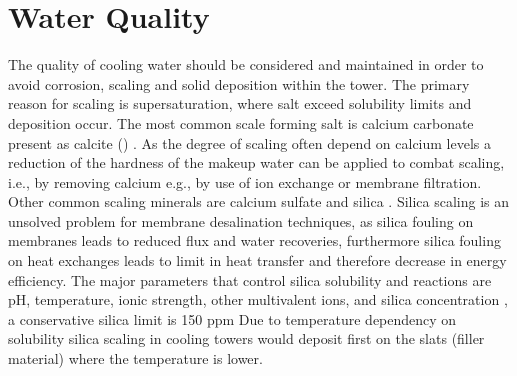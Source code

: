 \section{Water Quality}

The quality of cooling water should be considered and maintained in order to avoid corrosion, scaling and solid deposition within the tower.  \citep{IntroductionCoolingTower2014}
The primary reason for scaling is supersaturation, where salt exceed solubility limits and deposition occur. %
\citep{PracticalApproachWater2007} 
The most common scale forming salt is calcium carbonate present as calcite () \citep{IntroductionCoolingTower2014} \citep{PracticalApproachWater2007}. 
As the degree of scaling often depend on calcium levels a reduction of the hardness of the makeup water can be applied to combat scaling, i.e., by removing calcium e.g., by use of ion exchange or membrane filtration.  \citep{PracticalApproachWater2007}
Other common scaling minerals are %
calcium sulfate and silica  \citep{IntroductionCoolingTower2014} \citep{PracticalApproachWater2007}. 
Silica scaling is an unsolved problem for membrane desalination techniques, as silica fouling on membranes leads to reduced flux and water recoveries, furthermore silica fouling on heat exchanges leads to limit in heat transfer and therefore decrease in energy efficiency.  \citep{ChemistrySilicaScale2014}
The major parameters that control silica solubility and reactions are pH, temperature, ionic strength, other multivalent ions, and silica concentration \citep{ChemistrySilicaScale2014}, a conservative silica limit is 150 ppm \citep{IntroductionCoolingTower2014}
Due to temperature dependency on solubility silica scaling in cooling towers would deposit first on the slats (filler material) where the temperature is lower. \citep{IntroductionCoolingTower2014}

